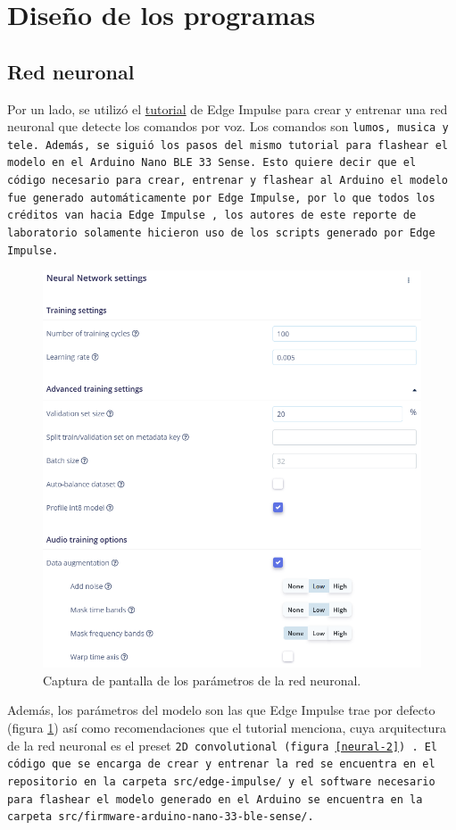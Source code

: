 \section{Diseño de los programas}
\subsection{Red neuronal}
Por un lado, se utilizó el \href{https://docs.edgeimpulse.com/docs/tutorials/end-to-end-tutorials/responding-to-your-voice}{tutorial} de Edge Impulse para crear y entrenar una red neuronal que detecte los comandos por voz. Los comandos son \tt{lumos}, \tt{musica} y \tt{tele}. Además, se siguió los pasos del mismo tutorial para flashear el modelo en el Arduino Nano BLE 33 Sense. Esto quiere decir que el código necesario para crear, entrenar y flashear al Arduino el modelo fue generado automáticamente por Edge Impulse, por lo que todos los créditos van hacia Edge Impulse \cite{tutorial}, los autores de este reporte de laboratorio solamente hicieron uso de los scripts generado por Edge Impulse.

\begin{figure}
    \centering
    \includegraphics[width=12cm]{Imagenes/neural-1.png}
    \caption{Captura de pantalla de los parámetros de la red neuronal.}
    \label{neural-1}
\end{figure}

Además, los parámetros del modelo son las que Edge Impulse trae por defecto (figura \ref{neural-1}) así como recomendaciones que el tutorial menciona, cuya arquitectura de la red neuronal es el preset \tt{2D convolutional} (figura \ref{neural-2}) \cite{tutorial}. El código que se encarga de crear y entrenar la red se encuentra en el repositorio en la carpeta \tt{src/edge-impulse/} y el software necesario para flashear el modelo generado en el Arduino se encuentra en la carpeta \tt{src/firmware-arduino-nano-33-ble-sense/}.

